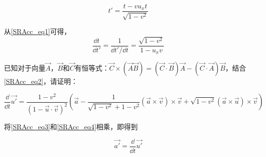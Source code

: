 \begin{equation}\label{SRAcc_eq1}
t'=\frac{t-vu_xt}{\sqrt{1-v^2}}
\end{equation}

从\autoref{SRAcc_eq1}可得，
\begin{equation}\label{SRAcc_eq3}
\frac{\dd t}{\dd t'}=\frac{1}{\dd t'/\dd t}=\frac{\sqrt{1-v^2}}{1-u_xv}
\end{equation}

\begin{exercise}{}

已知对于向量$\vec{A}$，$\vec{B}$和$\vec{C}$有恒等式：$\vec{C}\times(\vec{A}\vec{B})=(\vec{C}\cdot\vec{B})\vec{A}-(\vec{C}\cdot\vec{A})\vec{B}$，结合\autoref{SRAcc_eq2}，请证明：

\begin{equation}\label{SRAcc_eq4}

\frac{\dd}{\dd t}\vec{u'}=\frac{1-v^2}{(1-\vec{u}\cdot\vec{v})^2}(\vec{a}-\frac{1}{\sqrt{1-v^2}+1-v^2}(\vec{a}\times\vec{v})\times\vec{v}+\sqrt{1-v^2}(\vec{a}\times\vec{u})\times\vec{v})

\end{equation}

\end{exercise}

将\autoref{SRAcc_eq3}和\autoref{SRAcc_eq4}相乘，即得到

\begin{equation}

\vec{a'}=\frac{\dd}{\dd t}\vec{u'}

\end{equation}


